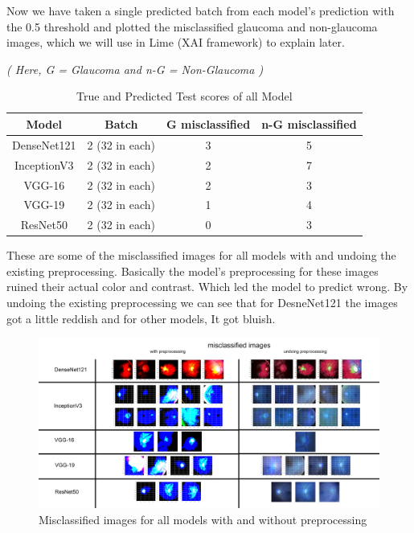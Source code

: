 \vspace{5mm}
\noindent Now we have taken a single predicted batch from each model’s prediction with the 0.5 threshold and plotted the misclassified glaucoma and non-glaucoma images, which we will use in Lime (XAI framework) to explain later.

\noindent \textit{( Here, G = Glaucoma and n-G = Non-Glaucoma )}
\begin{center}
\begin{table}[hbt!]
\centering
\begin{tabular}{|c | c | c| c |}
\hline
\textbf{Model} & \textbf{Batch} & \textbf{G misclassified} & \textbf{n-G misclassified}}\\

\hline
DenseNet121 & 2 (32 in each) & 3 &  5\\
\hline
InceptionV3 & 2 (32 in each) & 2 & 7\\
\hline
VGG-16 & 2 (32 in each) & 2 & 3\\
\hline
VGG-19 & 2 (32 in each) & 1 & 4\\
\hline
ResNet50 & 2 (32 in each) & 0 & 3\\
\hline

\end{tabular}
\caption{True and Predicted Test scores of all Model}
\label{tab:True and Predicted Test scores of all Model}
\end{table}
\end{center}
\newpage
\vspace{5mm}
\noindent These are some of the misclassified images for all models with and undoing the existing preprocessing. Basically the model’s preprocessing for these images ruined their actual color and contrast.  Which led the model to predict wrong. By undoing the existing preprocessing we can see that for DesneNet121 the images got a little reddish and for other models, It got bluish.

\vspace{5mm}
\begin{figure}[hbt!]
\centering
\includegraphics[scale=0.42]{images/fig-41.png}
\caption{Misclassified images for all models with and without preprocessing}
\label{fig:x True and Predicted Train scores of ResNet50}
\end{figure}

